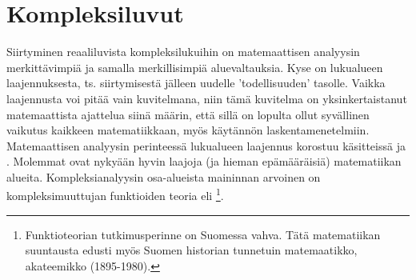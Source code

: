 \chapter{Kompleksiluvut}

Siirtyminen reaaliluvista kompleksilukuihin on matemaattisen analyysin merkittävimpiä ja samalla
merkillisimpiä aluevaltauksia. Kyse on lukualueen laajennuksesta, ts. siirtymisestä jälleen 
uudelle 'todellisuuden' tasolle. Vaikka laajennusta voi pitää vain kuvitelmana, niin tämä 
kuvitelma on yksinkertaistanut matemaattista ajattelua siinä määrin, että sillä on lopulta ollut
syvällinen vaikutus kaikkeen matematiikkaan, myös käytännön laskentamenetelmiin. Matemaattisen
analyysin perinteessä lukualueen laajennus korostuu käsitteissä  ja 
. Molemmat ovat nykyään hyvin laajoja (ja hieman epämääräisiä) 
matematiikan alueita. Kompleksianalyysin osa-alueista maininnan arvoinen on kompleksimuuttujan
funktioiden teoria eli \footnote[2]{Funktioteorian tutkimusperinne on 
Suomessa vahva. Tätä matematiikan suuntausta edusti myös Suomen historian tunnetuin 
matemaatikko, akateemikko  (1895-1980). }.
